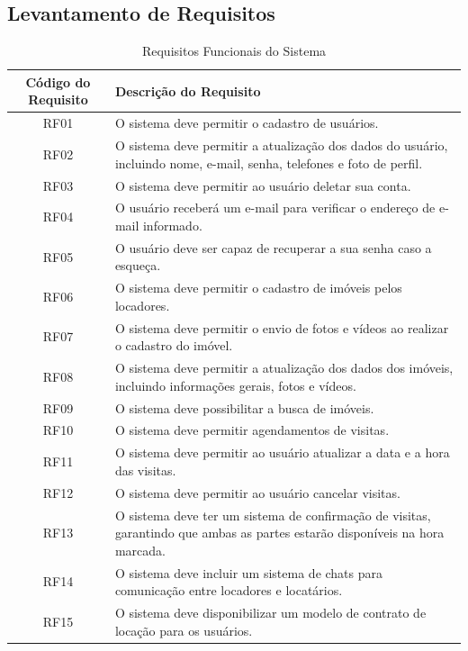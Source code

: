 \subsection{Levantamento de Requisitos}
\begin{table}[h!]
\centering
\caption{Requisitos Funcionais do Sistema}
\begin{tabular}{|c|p{10cm}|}
\hline
\textbf{Código do Requisito} & \textbf{Descrição do Requisito} \\
\hline
RF01 & O sistema deve permitir o cadastro de usuários. \\
\hline
RF02 & O sistema deve permitir a atualização dos dados do usuário, incluindo nome, e-mail, senha, telefones e foto de perfil. \\
\hline
RF03 & O sistema deve permitir ao usuário deletar sua conta. \\
\hline
RF04 & O usuário receberá um e-mail para verificar o endereço de e-mail informado. \\
\hline
RF05 & O usuário deve ser capaz de recuperar a sua senha caso a esqueça. \\
\hline
RF06 & O sistema deve permitir o cadastro de imóveis pelos locadores. \\
\hline
RF07 & O sistema deve permitir o envio de fotos e vídeos ao realizar o cadastro do imóvel. \\
\hline
RF08 & O sistema deve permitir a atualização dos dados dos imóveis, incluindo informações gerais, fotos e vídeos. \\
\hline
RF09 & O sistema deve possibilitar a busca de imóveis. \\
\hline
RF10 & O sistema deve permitir agendamentos de visitas. \\
\hline
RF11 & O sistema deve permitir ao usuário atualizar a data e a hora das visitas. \\
\hline
RF12 & O sistema deve permitir ao usuário cancelar visitas. \\
\hline
RF13 & O sistema deve ter um sistema de confirmação de visitas, garantindo que ambas as partes estarão disponíveis na hora marcada. \\
\hline
RF14 & O sistema deve incluir um sistema de chats para comunicação entre locadores e locatários. \\
\hline
RF15 & O sistema deve disponibilizar um modelo de contrato de locação para os usuários. \\
\hline
\end{tabular}
\label{tab:requisitos_funcionais}
\end{table}
